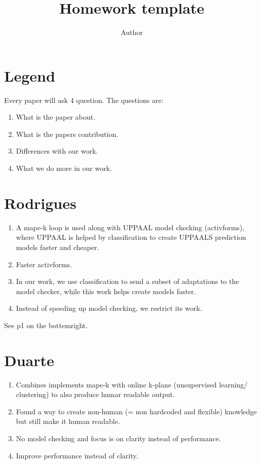 \documentclass[12pt]{article}
\begin{document}
 
 
\title{Homework template}
\author{Author}
\maketitle

\section{Legend}
Every paper will ask 4 question.
The questions are:
\begin{enumerate}

    \item What is the paper about.
    \item What is the papers contribution.
    \item Differences with our work.
    \item What we do more in our work.

\end{enumerate}

\section{Rodrigues}
\begin{enumerate}
    \item A mape-k loop is used along with UPPAAL model checking (activforms), where UPPAAL is helped by classification to create UPPAALS prediction models faster and cheaper.
    \item Faster activforms.
    \item In our work, we use classification to send a subset of adaptations to the model checker, while this work helps create models faster.
    \item Instead of speeding up model checking, we restrict its work.
\end{enumerate}
See p1 on the bottemright.

\section{Duarte}
\begin{enumerate}
    \item Combines implements mape-k with online k-plane (unsupervised learning/ clustering) to also produce humar readable output.
    \item Found a way to create non-human (= non hardcoded and flexible) knowledge but still make it human readable.
    \item No model checking and focus is on clarity instead of performance.
    \item Improve performance instead of clarity.
\end{enumerate}
\end{document}
